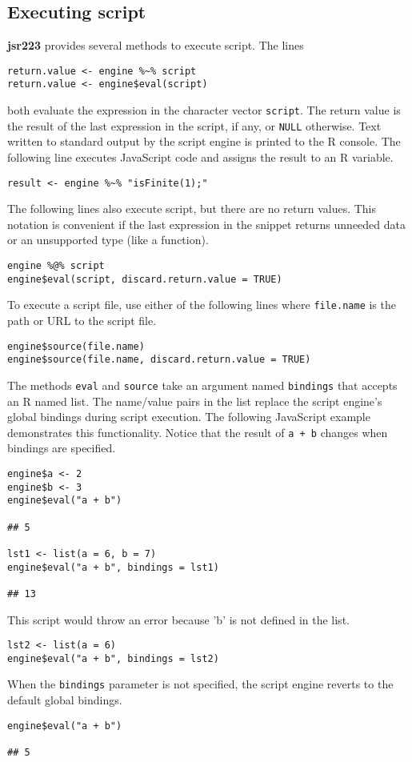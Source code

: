 \documentclass[
article,
11pt, %
a4paper, %
oneside, %
headinclude,footinclude, %
]{scrartcl}
\theoremstyle{definition} %
\theoremstyle{plain} %
\theoremstyle{remark} %
\newcommand{\pkg}[1]{\textbf{#1}}
\newcommand{\code}[1]{\texttt{#1}}
\begin{document}
\subsection{Executing script}

\pkg{jsr223} provides several methods to execute script. The lines

\begin{verbatim}
return.value <- engine %~% script
return.value <- engine$eval(script)
\end{verbatim}
both evaluate the expression in the character vector \code{script}. The return value is the result of the last expression in the script, if any, or \code{NULL} otherwise. Text written to standard output by the script engine is printed to the R console. The following line executes JavaScript code and assigns the result to an R variable.

\begin{verbatim}
result <- engine %~% "isFinite(1);"
\end{verbatim}
The following lines also execute script, but there are no return values. This notation is convenient if the last expression in the snippet returns unneeded data or an unsupported type (like a function).

\begin{verbatim}
engine %@% script
engine$eval(script, discard.return.value = TRUE)
\end{verbatim}
To execute a script file, use either of the following lines where \code{file.name} is the path or URL to the script file.

\begin{verbatim}
engine$source(file.name)
engine$source(file.name, discard.return.value = TRUE)
\end{verbatim}

The methods \code{eval} and \code{source} take an argument named \code{bindings} that accepts an R named list. The name/value pairs in the list replace the script engine's global bindings during script execution. The following JavaScript example demonstrates this functionality. Notice that the result of \code{a + b} changes when bindings are specified.

\begin{verbatim}
engine$a <- 2
engine$b <- 3
engine$eval("a + b")

## 5

lst1 <- list(a = 6, b = 7)
engine$eval("a + b", bindings = lst1)

## 13
\end{verbatim}
This script would throw an error because 'b' is not defined in the list.
\begin{verbatim}
lst2 <- list(a = 6)
engine$eval("a + b", bindings = lst2)
\end{verbatim}
When the \code{bindings} parameter is not specified, the script engine reverts to the default global bindings.
\begin{verbatim}
engine$eval("a + b")

## 5
\end{verbatim}
\end{document}
